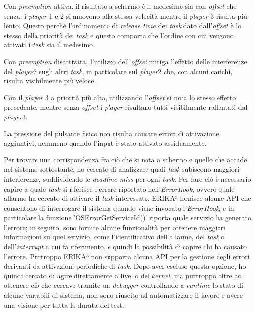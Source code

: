 \documentclass{article}
\begin{document}
Con \textit{preemption} attiva, il risultato a schermo è il medesimo sia con \textit{offset} che senza: i \textit{player} 1 e 2 si muovono alla stessa velocità mentre il \textit{player} 3 risulta più lento. Questo perchè l'ordinamento di \textit{release time} dei \textit{task} dato dall'\textit{offset} è lo stesso della priorità dei \textit{task} e questo comporta che l'ordine con cui vengono attivati i \textit{task} sia il medesimo.

Con \textit{preemption} disattivata, l'utilizzo dell'\textit{offset} mitiga l'effetto delle interferenze del \textit{player}3 sugli altri \textit{task}, in particolare sul \textit{player}2 che, con alcuni carichi, risulta visibilmente più veloce.

Con il \textit{player} 3 a priorità più alta, utilizzando l'\textit{offset} si nota lo stesso effetto precedente, mentre senza \textit{offset} i \textit{player} risultano tutti visibilmente rallentati dal \textit{player}3.

La pressione del pulsante fisico non risulta causare errori di attivazione aggiuntivi, nemmeno quando l'input è stato attivato assiduamente.

Per trovare una corrispondenza fra ciò che si nota a schermo e quello che accade nel sistema sottostante, ho cercato di analizzare quali \textit{task} subiscono maggiori interferenze, suddividendo le \textit{deadline miss} per ogni \textit{task}. 
Per fare ciò è necessario capire a quale \textit{task} si riferisce l'errore riportato nell'\textit{ErrorHook}, ovvero quale allarme ha cercato di attivare il \textit{task} interessato. ERIKA³ fornisce alcune API che consentono di interrogare il sistema quando viene invocato l'\textit{ErrorHook}, e in particolare la funzione 'OSErrorGetServiceId()' riporta quale servizio ha generato l'errore; in seguito, sono fornite alcune funzionalità per ottenere maggiori informazioni su quel servizio, come l'identificativo dell'allarme, del \textit{task} o dell'\textit{interrupt} a cui fa riferimento, e quindi la possibilità di capire chi ha causato l'errore. Purtroppo ERIKA³ non supporta alcuna API per la gestione degli errori derivanti da attivazioni periodiche di \textit{task}. Dopo aver escluso questa opzione, ho quindi cercato di agire direttamente a livello del \textit{kernel}, ma purtroppo oltre ad ottenere ciò che cercavo tramite un \textit{debugger} controllando a \textit{runtime} lo stato di alcune variabili di sistema, non sono riuscito ad automatizzare il lavoro e avere una visione per tutta la durata del test.
\end{document}
